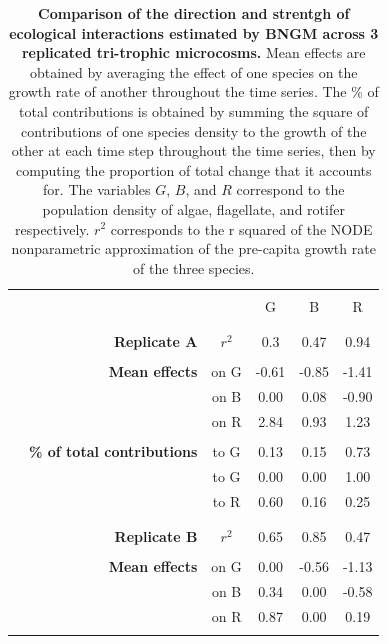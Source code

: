\documentclass[11pt, oneside]{article}
\begin{document}
\newpage
\begin{table}[H]
\begin{center}
\caption{
    \textbf{Comparison of the direction and strentgh of ecological interactions estimated by BNGM across 3 replicated tri-trophic microcosms.}
    Mean effects are obtained by averaging the effect of one species on the growth rate of another throughout the time series.
    The \% of total contributions is obtained by summing the square of contributions of one species density to the growth of the other at each time step throughout the time series, then by computing the proportion of total change that it accounts for.
    The variables $G$, $B$, and $R$ correspond to the population density of algae, flagellate, and rotifer respectively.
    $r^2$ corresponds to the r squared of the NODE nonparametric approximation of the pre-capita growth rate of the three species.
}
\begin{tabular}{rrcccc}
	\hline
	\\
	& & & G & B & R \\
	& \\
	\hline
	& \\
	& \textbf{Replicate A} & $r^2$ & 0.3 & 0.47 & 0.94 \\
	& \\
	& \textbf{Mean effects} 
	&   on G &  -0.61 & -0.85 & -1.41 \\
	& & on B &   0.00 &  0.08 & -0.90 \\
    & & on R &   2.84 &  0.93 &  1.23 \\
	& \\
	& \textbf{\% of total contributions} 
	&   to G &   0.13 &  0.15 &  0.73 \\ 
    & & to G &   0.00 &  0.00 &  1.00 \\
    & & to R &   0.60 &  0.16 &  0.25 \\
	& \\
	\hline
	& \\
    & \textbf{Replicate B} & $r^2$  &  0.65 & 0.85 & 0.47 \\
	& \\
	& \textbf{Mean effects} 
    &   on G &  0.00 & -0.56 & -1.13 \\
	& & on B &  0.34 &  0.00 & -0.58 \\
	& & on R &  0.87 &  0.00 &  0.19 \\
	& \\

\end{tabular}
\end{center}
\end{table}
\end{document}
